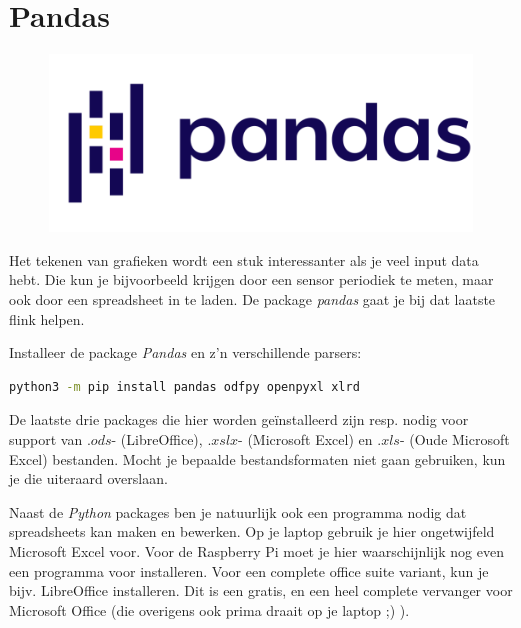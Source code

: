 \section{Pandas}
\begin{figure}[!ht]
\centering\includegraphics[scale=0.2]{Pictures/chapter07/pandas_logo.png}
\label{fig:pandaslogo} %
\end{figure}

Het tekenen van grafieken wordt een stuk interessanter als je veel input data hebt. Die kun je bijvoorbeeld krijgen door een sensor periodiek te meten, maar ook door een spreadsheet in te laden. De package \textit{pandas} gaat je bij dat laatste flink helpen.

\begin{exercise}
Installeer de package \textit{Pandas} en z'n verschillende parsers:
\begin{lstlisting}[language=bash]
python3 -m pip install pandas odfpy openpyxl xlrd
\end{lstlisting}
De laatste drie packages die hier worden geïnstalleerd zijn resp. nodig voor support van $.ods$- (LibreOffice), $.xslx$- (Microsoft Excel) en $.xls$- (Oude Microsoft Excel) bestanden. Mocht je bepaalde bestandsformaten niet gaan gebruiken, kun je die uiteraard overslaan.
\end{exercise}

Naast de \textit{Python} packages ben je natuurlijk ook een programma nodig dat spreadsheets kan maken en bewerken. Op je laptop gebruik je hier ongetwijfeld Microsoft Excel voor. Voor de Raspberry Pi moet je hier waarschijnlijk nog even een programma voor installeren. Voor een complete office suite variant, kun je bijv. LibreOffice installeren. Dit is een gratis, en een heel complete vervanger voor Microsoft Office (die overigens ook prima draait op je laptop ;) ).

